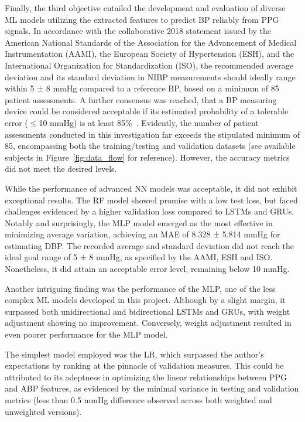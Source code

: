 Finally, the third objective entailed the development and evaluation of diverse ML models utilizing the extracted features to predict BP reliably from PPG signals.
In accordance with the collaborative 2018 statement issued by the American National Standards of the Association for the Advancement of Medical Instrumentation (AAMI), the European Society of Hypertension (ESH), and the International Organization for Standardization (ISO),
the recommended average deviation and its standard deviation in NIBP measurements should ideally range within 5 ± 8 mmHg compared to a reference BP, based on a minimum of 85 patient assessments.
A further consensus was reached, that a BP measuring device could be considered acceptable if its estimated probability of a tolerable error ($\leq$10 mmHg) is at least 85\%~\cite{stergiouUniversalStandardValidation2018}.
Evidently, the number of patient assessments conducted in this investigation far exceeds the stipulated minimum of 85, encompassing both the training/testing and validation datasets (see available subjects in Figure~\ref{fig:data_flow} for reference).
However, the accuracy metrics did not meet the desired levels.

While the performance of advanced NN models was acceptable, it did not exhibit exceptional results.
The RF model showed promise with a low test loss, but faced challenges evidenced by a higher validation loss compared to LSTMs and GRUs.
Notably and surprisingly, the MLP model emerged as the most effective in minimizing average variation, achieving an MAE of 8.328 ± 5.814 mmHg for estimating DBP\@.
The recorded average and standard deviation did not reach the ideal goal range of 5 ± 8 mmHg, as specified by the AAMI, ESH and ISO\@.
Nonetheless, it did attain an acceptable error level, remaining below 10 mmHg.

Another intriguing finding was the performance of the MLP, one of the less complex ML models developed in this project.
Although by a slight margin, it surpassed both unidirectional and bidirectional LSTMs and GRUs, with weight adjustment showing no improvement.
Conversely, weight adjustment resulted in even poorer performance for the MLP model.

The simplest model employed was the LR, which surpassed the author's expectations by ranking at the pinnacle of validation measures.
This could be attributed to its adeptness in optimizing the linear relationships between PPG and ABP features,
as evidenced by the minimal variance in testing and validation metrics (less than 0.5 mmHg difference observed across both weighted and unweighted versions).

